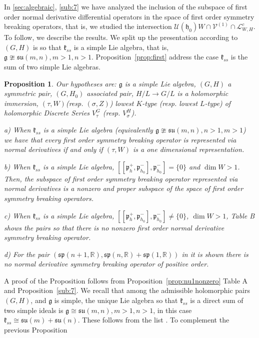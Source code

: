 \documentclass[12pt]{amsart}
\newtheorem{prop}[thm]{Proposition}
\theoremstyle{definition}
\theoremstyle{remark}
\newcommand{\g}{\mathfrak{g}}
\newcommand{\h}{\mathfrak{h}}
\renewcommand{\k}{{\mathfrak k}}
\newcommand{\p}{\mathfrak p}
\newcommand{\R}{{\mathbb R}}
\numberwithin{equation}{section}
\begin{document}
 In \ref{sec:algebraic},  \ref{sub:7}   we have analyzed the inclusion  of  the subspace of first order normal derivative differential operators in the space of first order symmetry breaking operators, that is, we studied the intersection   $\mathcal U(\h_0)W
\cap \mathcal V^{(1)}\cap   \mathcal L_{W,H}^c$. To follow, we describe the results. We split up the presentation according to $(G,H)$ is so that $\k_{ss}$ is a simple Lie algebra, that is, $\g\ncong \mathfrak{su}(m,n), m>1,n>1$.   Proposition~\ref{prop:first} address the case  $\k_{ss}$ is the sum of two simple Lie algebras.
\begin{prop}\label{prop:nonormal}Our hypotheses
  are: $\g$ is a simple Lie algebra, $(G,H)$ a symmetric pair, $(G,H_0)$ associated pair, $H/L \rightarrow G/L$ is a holomorphic immersion, $(\tau, W)$(resp. $(\sigma, Z)$) lowest $K$-type (resp. lowest $L$-type) of holomorphic Discrete Series $V_\tau^G$ (resp. $V_\sigma^H$).

a) When $\k_{ss}$ is a simple Lie algebra (equivalently $\g\ncong \mathfrak{su}(m,n), n>1,m>1$) we have that every first order symmetry breaking operator is represented via normal derivatives if and only if $(\tau, W)$ is a one dimensional representation.

b) When  $\k_{ss}$ is a simple Lie algebra, $ [[\p_h^+, \p_{h_0}^-],\p_{h_0}^-]=\{0\}$ and $\dim W>1$. Then,   the subspace of first order symmetry breaking operator represented via normal derivatives is a nonzero and  proper subspace of the space of first order symmetry breaking operators.

c) When  $\k_{ss}$ is a simple Lie algebra, $ [[\p_h^+, \p_{h_0}^-],\p_{h_0}^-]\not=\{0\}$,  $\dim W>1$,  Table B shows   the pairs  so that there is no nonzero first order normal derivative symmetry breaking operator.

d) For the pair $(\mathfrak{sp}(n+1, \R), \mathfrak{sp}(n, \R)+\mathfrak{sp}(1, \R))$ in \cite[Theorem 5.3]{KP2} it is shown there is no normal derivative symmetry breaking operator of positive order.
\end{prop}
A proof of the Proposition follows from Proposition~\ref{prop:nu1nonzero} Table A and Proposition~\ref{sub:7}. We recall that among  the admissible holomorphic pairs $(G,H)$, and  $\g$ is simple,   the unique   Lie algebra so that $\k_{ss}$   is a direct sum of two simple ideals is $\g \cong \mathfrak{su}(m,n), m>1,n>1$, in this case $\k_{ss} \cong \mathfrak{su}(m)+\mathfrak{su}(n)$.    These follows from   the list  \cite[Table 3]{OV4}\cite[Table 2]{KOadv}. To complement the previous Proposition
\end{document}
